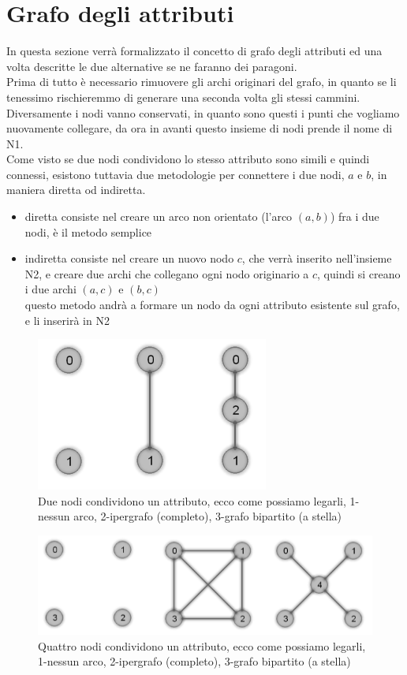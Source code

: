 \section{Grafo degli attributi}
In questa sezione verrà formalizzato il concetto di grafo degli attributi ed una volta descritte le due alternative se ne faranno dei paragoni.\\
Prima di tutto è necessario rimuovere gli archi originari del grafo, in quanto se li tenessimo rischieremmo di generare una seconda volta gli stessi cammini. Diversamente i nodi vanno conservati, in quanto sono questi i punti che vogliamo nuovamente collegare, da ora in avanti questo insieme di nodi prende il nome di N1.\\
Come visto se due nodi condividono lo stesso attributo sono simili e quindi connessi, esistono tuttavia due metodologie per connettere i due nodi, $a$ e $b$, in maniera diretta od indiretta.
\begin{itemize}
	\item diretta consiste nel creare un arco non orientato (l'arco $(a, b)$) fra i due nodi, è il metodo semplice
	\item indiretta consiste nel creare un nuovo nodo $c$, che verrà inserito nell'insieme N2, e creare due archi che collegano ogni nodo originario a $c$, quindi si creano i due archi $(a, c)$ e $(b, c)$\\
	questo metodo andrà a formare un nodo da ogni attributo esistente sul grafo, e li inserirà in N2
\end{itemize}
%
\begin{figure}[htp]
	\centering
	\includegraphics{immagini/add_att2}
	\caption{Due nodi condividono un attributo, ecco come possiamo legarli, 1-nessun arco, 2-ipergrafo (completo), 3-grafo bipartito (a stella)}
	\label{fig:add_att2}
\end{figure}
\begin{figure}[htp]
	\centering
	\includegraphics[width=\linewidth]{immagini/add_att4}
	\caption{Quattro nodi condividono un attributo, ecco come possiamo legarli, 1-nessun arco, 2-ipergrafo (completo), 3-grafo bipartito (a stella)}
	\label{fig:add_att4}
\end{figure}

